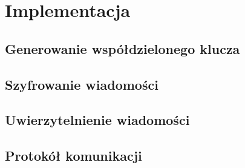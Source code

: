 \chapter{Implementacja}
\section{Generowanie współdzielonego klucza}
\section{Szyfrowanie wiadomości}
\section{Uwierzytelnienie wiadomości}
\section{Protokół komunikacji}
